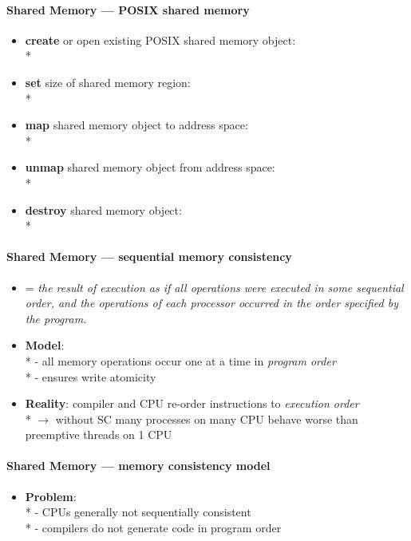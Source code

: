 \paragraph{Shared Memory --- POSIX shared memory}
\begin{itemize}
  \item \textbf{create} or open existing POSIX shared memory object: \\*
  \item \textbf{set} size of shared memory region: \\*
  \item \textbf{map} shared memory object to address space: \\*
  \item \textbf{unmap} shared memory object from address space: \\*
  \item \textbf{destroy} shared memory object: \\*
\end{itemize}

\paragraph{Shared Memory --- sequential memory consistency}
\begin{itemize}
  \item = \emph{the result of execution as if all operations were executed in some sequential order, and the operations of each processor occurred in the order specified by the program.}
  \item \textbf{Model}: \\*
    - all memory operations occur one at a time in \emph{program order} \\*
    - ensures write atomicity
  \item \textbf{Reality}: compiler and CPU re-order instructions to \emph{execution order} \\*
    \( \to \) without SC many processes on many CPU behave worse than preemptive threads on 1 CPU
\end{itemize}

\paragraph{Shared Memory --- memory consistency model}
\begin{itemize}
  \item \textbf{Problem}: \\*
    - CPUs generally not sequentially consistent \\*
    - compilers do not generate code in program order
\end{itemize}

